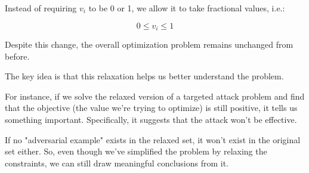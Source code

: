 Instead of requiring $v_i$ to be 0 or 1, we allow it to take fractional values, i.e.:

\[ 0  \leq v_i \leq 1\]


Despite this change, the overall optimization problem remains unchanged from before.

The key idea is that this relaxation helps us better understand the problem. 

For instance, if we solve the relaxed version of a targeted attack problem and
find that the objective (the value we're trying to optimize) is still positive, 
it tells us something important. Specifically, it suggests that the attack won't be effective.


If no "adversarial example" exists in the relaxed set, it won't exist in the original 
set either. So, even though we've simplified the problem by relaxing the constraints, we 
can still draw meaningful conclusions from it.